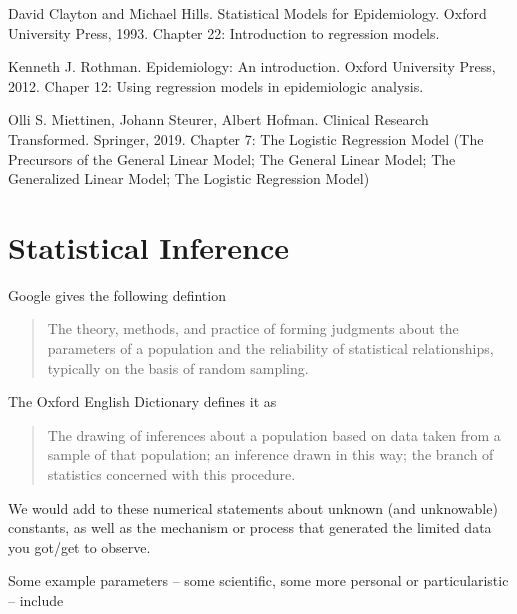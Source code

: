 \documentclass[]{book}
\begin{document}
David Clayton and Michael Hills. Statistical Models for Epidemiology. Oxford University Press, 1993. Chapter 22: Introduction to regression models.

Kenneth J. Rothman. Epidemiology: An introduction.
Oxford University Press, 2012. Chaper 12: Using regression models in epidemiologic analysis.

Olli S. Miettinen, Johann Steurer, Albert Hofman.
Clinical Research Transformed. Springer, 2019.
Chapter 7: The Logistic Regression Model (The Precursors of the General Linear Model; The General Linear Model; The Generalized Linear Model; The Logistic Regression Model)

\hypertarget{inference}{%
\chapter{Statistical Inference}\label{inference}}

Google gives the following defintion

\begin{quote}
The theory, methods, and practice of forming judgments about the parameters of a population and the reliability of statistical relationships, typically on the basis of random sampling.
\end{quote}

The Oxford English Dictionary defines it as

\begin{quote}
The drawing of inferences about a population based on data taken from a sample of that population; an inference drawn in this way; the branch of statistics concerned with this procedure.
\end{quote}

We would add to these numerical statements about unknown (and unknowable) constants, as well as the mechanism or process that generated the limited data you got/get to observe.

Some example parameters -- some scientific, some more personal or particularistic -- include
\end{document}
